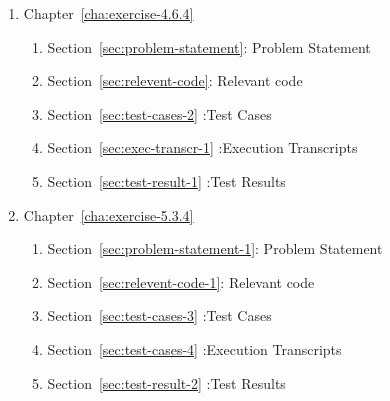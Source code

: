 \documentclass{report}
\begin{document}
\begin{description}
\begin{enumerate}[{}]
\begin{enumerate}[{}]
    \end{enumerate}


    \item Chapter~\ref{cha:exercise-4.6.4}
    \begin{enumerate}[{}]
    \item Section~\ref{sec:problem-statement}: Problem Statement
    \item Section~\ref{sec:relevent-code}: Relevant code
    \item Section~\ref{sec:test-cases-2} :Test Cases
    \item Section~\ref{sec:exec-transcr-1} :Execution Transcripts
    \item Section~\ref{sec:test-result-1} :Test Results
    \end{enumerate}


  \item Chapter~\ref{cha:exercise-5.3.4}
   \begin{enumerate}[{}]
   \item Section~\ref{sec:problem-statement-1}: Problem Statement
    \item Section~\ref{sec:relevent-code-1}: Relevant code
    \item Section~\ref{sec:test-cases-3} :Test Cases
    \item Section~\ref{sec:test-cases-4} :Execution Transcripts
    \item Section~\ref{sec:test-result-2} :Test Results
   \end{enumerate}



\end{enumerate}
\end{description}
\end{document}
